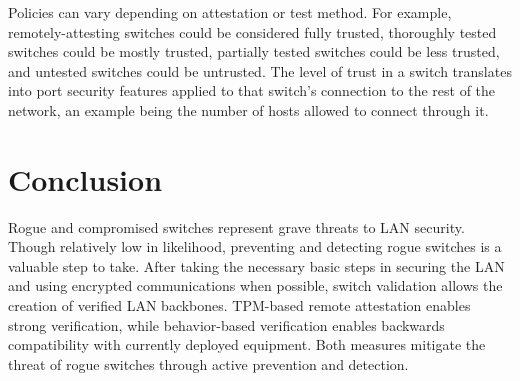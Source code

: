 \documentclass[journal]{IEEEtran}
\begin{document}
Policies can vary depending on attestation or test method. For example, remotely-attesting switches
could be considered fully trusted, thoroughly tested switches could be mostly trusted, partially
tested switches could be less trusted, and untested switches could be untrusted. The level of trust
in a switch translates into port security features applied to that switch's connection to the rest
of the network, an example being the number of hosts allowed to connect through it.



\section{Conclusion}
Rogue and compromised switches represent grave threats to LAN security. Though relatively low in
likelihood, preventing and detecting rogue switches is a valuable step to take. After taking the
necessary basic steps in securing the LAN and using encrypted communications when possible,
switch validation allows the creation of verified LAN backbones. TPM-based remote attestation
enables strong verification, while behavior-based verification enables backwards compatibility with
currently deployed equipment. Both measures mitigate the threat of rogue switches through active
prevention and detection.







\end{document}
